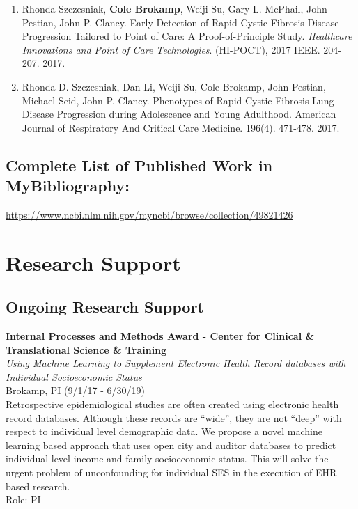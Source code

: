 \documentclass{nihbiosketch}
\begin{document}
\begin{enumerate}
\begin{enumerate}
	\item Rhonda Szczesniak, \textbf{Cole Brokamp}, Weiji Su, Gary L. McPhail, John Pestian, John P. Clancy. Early Detection of Rapid Cystic Fibrosis Disease Progression Tailored to Point of Care: A Proof-of-Principle Study. \textit{Healthcare Innovations and Point of Care Technologies}. (HI-POCT), 2017 IEEE. 204-207. 2017.

	\item Rhonda D. Szczesniak, Dan Li, Weiji Su, Cole Brokamp, John Pestian, Michael Seid, John P. Clancy. Phenotypes of Rapid Cystic Fibrosis Lung Disease Progression during Adolescence and Young Adulthood. American Journal of Respiratory And Critical Care Medicine. 196(4). 471-478. 2017.
	
\end{enumerate}

\end{enumerate}

\subsection*{Complete List of Published Work in MyBibliography:} 
\url{https://www.ncbi.nlm.nih.gov/myncbi/browse/collection/49821426}

\section{Research Support}

\subsection*{Ongoing Research Support}

\bigskip

\textbf{Internal Processes and Methods Award - Center for Clinical \&
Translational Science \& Training}\\
\emph{Using Machine Learning to Supplement Electronic Health Record
databases with Individual Socioeconomic Status}\\
Brokamp, PI (9/1/17 - 6/30/19)\\
Retrospective epidemiological studies are often created using electronic
health record databases. Although these records are ``wide'', they are
not ``deep'' with respect to individual level demographic data. We
propose a novel machine learning based approach that uses open city and
auditor databases to predict individual level income and family
socioeconomic status. This will solve the urgent problem of
unconfounding for individual SES in the execution of EHR based
research.\\
Role: PI
\end{document}
